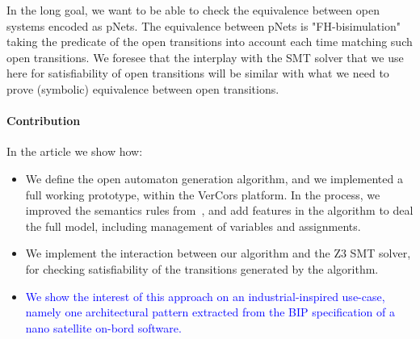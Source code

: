 \documentclass{lncs/llncs}
\newcommand{\ERIC}[1]{\textcolor{blue}{#1}}
\begin{document}
In the long goal, we want to be able to check the equivalence between
open systems encoded as pNets. The equivalence between pNets is
"FH-bisimulation" taking the 
predicate of the open transitions into account each time matching such
open transitions. We foresee that the interplay with the SMT solver
that we use here for satisfiability of open transitions will be
similar with what we need to prove (symbolic) equivalence between open
transitions. 


\paragraph{Contribution}
In the article we show how:
\begin{itemize}
\item We define the open automaton generation algorithm, and we
  implemented a full working prototype, within the 
  VerCors platform. In the process, we improved the
  semantics rules from~\cite{henrio:Forte2016}, and add features in
  the algorithm to deal the full 
  model, including management of variables and assignments.
\item We implement the interaction between our algorithm and the Z3
    SMT solver, for checking satisfiability of the transitions
    generated by the algorithm.
  \item \ERIC{We show the interest of this approach on an
    industrial-inspired use-case, namely one architectural pattern
    extracted from the BIP specification of a nano satellite on-bord
    software.} 
\end{itemize}
\end{document}
